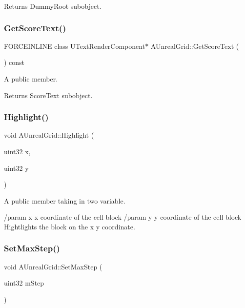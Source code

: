 Returns Dummy\+Root subobject. \hypertarget{class_a_unreal_grid_a2b699473afc36a77c3719002ae37bd9d}{}\label{class_a_unreal_grid_a2b699473afc36a77c3719002ae37bd9d} 
\subsubsection{\texorpdfstring{Get\+Score\+Text()}{GetScoreText()}}
{\footnotesize\ttfamily F\+O\+R\+C\+E\+I\+N\+L\+I\+NE class U\+Text\+Render\+Component$\ast$ A\+Unreal\+Grid\+::\+Get\+Score\+Text (\begin{DoxyParamCaption}{ }\end{DoxyParamCaption}) const\hspace{0.3cm}{\ttfamily [inline]}}



A public member. 

Returns Score\+Text subobject. \hypertarget{class_a_unreal_grid_ab6dd0588dcf8892df18183d9eae54036}{}\label{class_a_unreal_grid_ab6dd0588dcf8892df18183d9eae54036} 
\subsubsection{\texorpdfstring{Highlight()}{Highlight()}}
{\footnotesize\ttfamily void A\+Unreal\+Grid\+::\+Highlight (\begin{DoxyParamCaption}\item[{uint32}]{x,  }\item[{uint32}]{y }\end{DoxyParamCaption})}



A public member taking in two variable. 

/param x x coordinate of the cell block /param y y coordinate of the cell block Hightlights the block on the x y coordinate. \hypertarget{class_a_unreal_grid_a7c1328560c61da12f8e515f149457999}{}\label{class_a_unreal_grid_a7c1328560c61da12f8e515f149457999} 
\subsubsection{\texorpdfstring{Set\+Max\+Step()}{SetMaxStep()}}
{\footnotesize\ttfamily void A\+Unreal\+Grid\+::\+Set\+Max\+Step (\begin{DoxyParamCaption}\item[{uint32}]{m\+Step }\end{DoxyParamCaption})}



